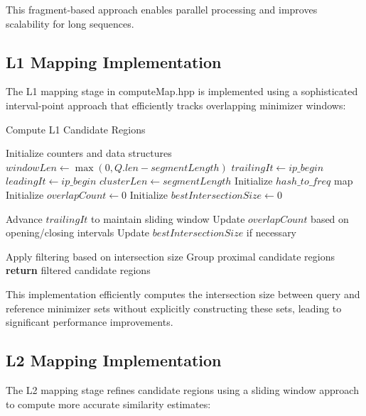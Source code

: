 \documentclass{article}
\begin{document}
This fragment-based approach enables parallel processing and improves scalability for long sequences.

\subsection{L1 Mapping Implementation}

The L1 mapping stage in computeMap.hpp is implemented using a sophisticated interval-point approach that efficiently tracks overlapping minimizer windows:

\begin{algorithm}
\caption{Compute L1 Candidate Regions}
\begin{algorithmic}[1]
\State Initialize counters and data structures
\State $windowLen \gets \max(0, Q.len - segmentLength)$
\State $trailingIt \gets ip\_begin$
\State $leadingIt \gets ip\_begin$
\State $clusterLen \gets segmentLength$
\State Initialize $hash\_to\_freq$ map
\State Initialize $overlapCount \gets 0$
\State Initialize $bestIntersectionSize \gets 0$

    \State Advance $trailingIt$ to maintain sliding window
    \State Update $overlapCount$ based on opening/closing intervals
    \State Update $bestIntersectionSize$ if necessary
\EndWhile

\State Apply filtering based on intersection size
\State Group proximal candidate regions
\State \textbf{return} filtered candidate regions
\EndProcedure
\end{algorithmic}
\end{algorithm}

This implementation efficiently computes the intersection size between query and reference minimizer sets without explicitly constructing these sets, leading to significant performance improvements.

\subsection{L2 Mapping Implementation}

The L2 mapping stage refines candidate regions using a sliding window approach to compute more accurate similarity estimates:
\end{document}
